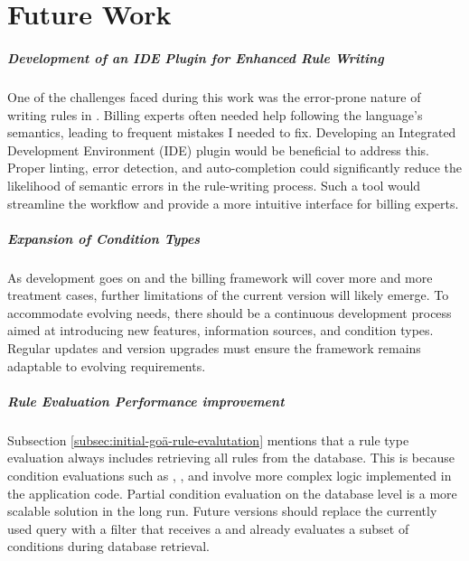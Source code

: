 \chapter{Future Work}\label{ch:future-work}

\paragraph{Development of an IDE Plugin for Enhanced Rule Writing}
One of the challenges faced during this work was the error-prone nature of writing rules in \RF.
Billing experts often needed help following the language's semantics, leading to frequent mistakes I needed to fix.
Developing an Integrated Development Environment (IDE) plugin would be beneficial to address this.
Proper linting, error detection, and auto-completion could significantly reduce the likelihood of semantic errors
in the rule-writing process.
Such a tool would streamline the workflow and provide a more intuitive interface for billing experts.

\paragraph{Expansion of Condition Types}
As development goes on and the billing framework will cover more and more treatment cases,
further limitations of the current version will likely emerge.
To accommodate evolving needs, there should be a continuous development process aimed at introducing new features,
information sources, and condition types.
Regular updates and version upgrades must ensure the framework remains adaptable to evolving requirements.

\paragraph{Rule Evaluation Performance improvement}
Subsection \ref{subsec:initial-goä-rule-evalutation} mentions that a rule type evaluation always includes retrieving all rules from the database.
This is because condition evaluations such as \anamnesisBlocks, \physicalBlocks, and \requiredIcdCodes involve more complex logic implemented in the application code.
Partial condition evaluation on the database level is a more scalable solution in the long run.
Future versions should replace the currently used  query with a filter that receives a \REI and already evaluates a subset of conditions during database retrieval.

